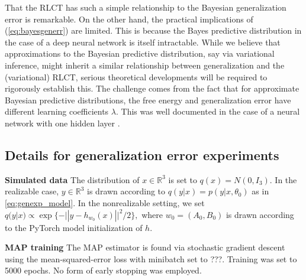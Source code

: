 \documentclass{article} %
\begin{document}
That the RLCT has such a simple relationship to the Bayesian generalization error is remarkable. On the other hand, the practical implications of (\ref{eq:bayesgenerr}) are limited. This is because the Bayes predictive distribution in the case of a deep neural network is itself intractable. While we believe that approximations to the Bayesian predictive distribution, say via variational inference, might inherit a similar relationship between generalization and the (variational) RLCT, serious theoretical developments will be required to rigorously establish this. The challenge comes from the fact that for approximate Bayesian predictive distributions, the free energy and generalization error have different learning coefficients $\lambda$. This was well documented in the case of a neural network with one hidden layer \citep{nakajima_variational_2007}. 

\subsection{Details for generalization error experiments}
\label{appendix:generalizaton}

\textbf{Simulated data}
The distribution of $x \in \mathbb R^3$ is set to $q(x)=N(0,I_3)$. 
In the realizable case, $y \in \mathbb R^3$ is drawn according to $q(y|x) = p(y|x,\theta_0)$ as in \eqref{eq:genexp_model}. In the nonrealizable setting, we set $q(y|x) \propto \exp\{-|| y - h_{w_0}(x) ||^2/2\},$ where $w_0 = (A_0,B_0)$ is drawn according to the PyTorch model initialization of $h$.


\textbf{MAP training}
The MAP estimator is found via stochastic gradient descent using the mean-squared-error loss with minibatch set to ???. Training was set to 5000 epochs. No form of early stopping was employed.
\end{document}
